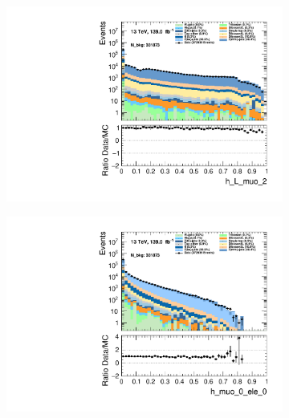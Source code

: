 \begin{figure}
    \centering
    \begin{subfigure}{.49\textwidth}
        \includegraphics[width=\textwidth]{Figures/MC_Data_comp/h_L_muo_2.pdf}
        \caption{}
        \label{fig:et}
    \end{subfigure}
    \hfill
    \begin{subfigure}{.49\textwidth}
        \includegraphics[width=\textwidth]{Figures/MC_Data_comp/h_muo_0_ele_0.pdf}
        \caption{ }
        \label{fig:flcp}
    \end{subfigure}
    \hfill 
    \begin{subfigure}{.49\textwidth}

\end{subfigure}
\end{figure}
